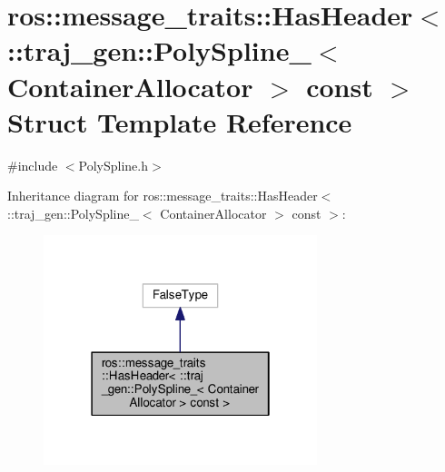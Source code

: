 \hypertarget{structros_1_1message__traits_1_1_has_header_3_01_1_1traj__gen_1_1_poly_spline___3_01_container_allocator_01_4_01const_01_01_4}{}\section{ros\+:\+:message\+\_\+traits\+:\+:Has\+Header$<$ \+:\+:traj\+\_\+gen\+:\+:Poly\+Spline\+\_\+$<$ Container\+Allocator $>$ const $>$ Struct Template Reference}
\label{structros_1_1message__traits_1_1_has_header_3_01_1_1traj__gen_1_1_poly_spline___3_01_container_allocator_01_4_01const_01_01_4}


{\ttfamily \#include $<$Poly\+Spline.\+h$>$}



Inheritance diagram for ros\+:\+:message\+\_\+traits\+:\+:Has\+Header$<$ \+:\+:traj\+\_\+gen\+:\+:Poly\+Spline\+\_\+$<$ Container\+Allocator $>$ const $>$\+:
\nopagebreak
\begin{figure}[H]
\begin{center}
\leavevmode
\includegraphics[width=226pt]{structros_1_1message__traits_1_1_has_header_3_01_1_1traj__gen_1_1_poly_spline___3_01_container_a0476a97252d1bf162707852ba289ac0f}
\end{center}
\end{figure}


